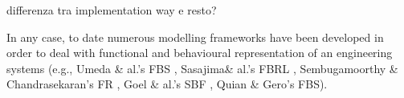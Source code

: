 \documentclass[sw]{iosart2x}
\newcommand{\TODO}[1]{{\color{red} #1}}
\begin{document}
\TODO{differenza tra implementation way e resto?}

In any case, to date numerous modelling frameworks have been developed in order to deal with functional and behavioural representation of an engineering systems (e.g., Umeda \& al.'s FBS \cite{umedaFunctionBehaviourStructure1990}, Sasajima\& al.'s FBRL \cite{sasajimaFBRLFunctionBehavior1995}, Sembugamoorthy \& Chandrasekaran's FR \cite{sembugamoorthy1986functional}, Goel \& al.'s SBF \cite{goelUseDesignPatterns2004}, Quian \& Gero's FBS).
\end{document}
